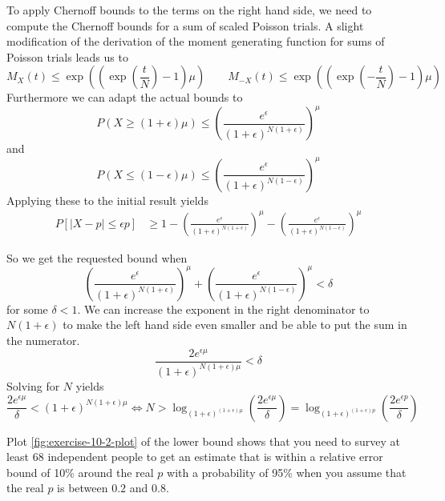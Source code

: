\documentclass[10pt,a4paper]{article}
\begin{document}
To apply Chernoff bounds to the terms on the right hand side, we need to compute the Chernoff bounds for a sum of scaled Poisson trials.
A slight modification of the derivation of the moment generating function for sums of Poisson trials leads us to
\begin{equation*}
  M_{X}(t) \le \exp\left( \left(\exp\left(\frac{t}{N}\right) - 1\right)\mu \right) \qquad M_{-X}(t) \le \exp\left( \left(\exp\left(-\frac{t}{N}\right) - 1\right)\mu \right)
\end{equation*}
Furthermore we can adapt the actual bounds to
\begin{equation*}
  P\left( X \ge (1 + \epsilon)\mu \right) \le \left( \frac{e^{\epsilon}}{(1 + \epsilon)^{N(1 + \epsilon)}} \right)^{\mu}
\end{equation*}
and
\begin{equation*}
  P\left( X \le (1 - \epsilon)\mu \right) \le \left( \frac{e^{\epsilon}}{(1 + \epsilon)^{N(1 - \epsilon)}} \right)^{\mu}
\end{equation*}
Applying these to the initial result yields
\begin{align*}
  P[|X - p| \le \epsilon p] & \ge 1 - \left( \frac{e^{\epsilon}}{(1 + \epsilon)^{N(1 + \epsilon)}} \right)^{\mu} - \left( \frac{e^{\epsilon}}{(1 + \epsilon)^{N(1 - \epsilon)}} \right)^{\mu}
\end{align*}

So we get the requested bound when
\begin{equation*}
  \left( \frac{e^{\epsilon}}{(1 + \epsilon)^{N(1 + \epsilon)}} \right)^{\mu} + \left( \frac{e^{\epsilon}}{(1 + \epsilon)^{N(1 - \epsilon)}} \right)^{\mu} < \delta
\end{equation*}
for some $\delta < 1$.
We can increase the exponent in the right denominator to $N(1 + \epsilon)$ to make the left hand side even smaller and be able to put the sum in the numerator.
\begin{equation*}
  \frac{2e^{\epsilon\mu}}{(1 + \epsilon)^{N(1 + \epsilon)\mu}} < \delta
\end{equation*}
Solving for $N$ yields
\begin{equation*}
  \frac{2e^{\epsilon\mu}}{\delta} < (1 + \epsilon)^{N(1 + \epsilon)\mu} \Leftrightarrow N > \log_{(1 + \epsilon)^{(1 + \epsilon)\mu}}\left( \frac{2e^{\epsilon\mu}}{\delta} \right) = \log_{(1 + \epsilon)^{(1 + \epsilon)p}}\left( \frac{2e^{\epsilon p}}{\delta} \right)
\end{equation*}

Plot \ref{fig:exercise-10-2-plot} of the lower bound shows that you need to survey at least 68 independent people to get an estimate that is within a relative error bound of 10\% around the real $p$ with a probability of 95\% when you assume that the real $p$ is between $0.2$ and $0.8$.
\end{document}
